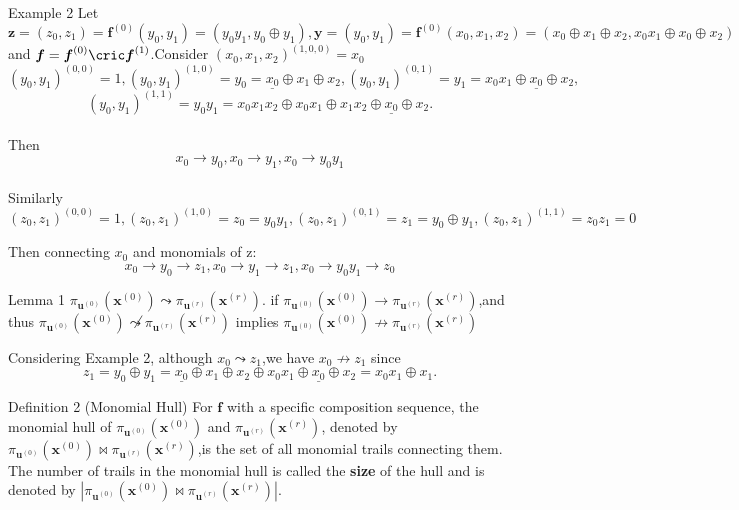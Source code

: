 \documentclass[notheorems, aspectratio=169]{beamer}
\def\bd#1{\boldsymbol{#1}}
\begin{document}
\begin{frame}
    \begin{block}{Example 2}
        Let $\boldsymbol{z}=(z_0,z_1)=\boldsymbol{f}^{(0)}(y_0,y_1)=(y_0y_1,y_0 \oplus y_1),\boldsymbol{y}=(y_0,y_1)=
        \boldsymbol{f}^{(0)}(x_0,x_1,x_2)=(x_0\oplus x_1 \oplus x_2 ,x_0x_1 \oplus x_0 \oplus x_2)$ and 
        $ \boldsymbol{f}=\boldsymbol{f}^{(0)} \cric \boldsymbol{f}^{(1)}$.Consider $(x_0,x_1,x_2)^{(1,0,0)}=x_0$
        $$
            (y_0,y_1)^{(0,0)}=1,(y_0,y_1)^{(1,0)}=y_0=\underline{x_0}\oplus x_1\oplus x_2,(y_0,y_1)^{(0,1)}=y_1=x_0x_1\oplus 
             \underline{x_0} \oplus x_2,
        $$
        $$
            (y_0,y_1)^{(1,1)}=y_0y_1=x_0x_1x_2 \oplus x_0x_1\oplus x_1x_2 \oplus \underline{x_0} \oplus x_2.
        $$
        \\Then $$ x_0 \rightarrow y_0,x_0\rightarrow y_1,x_0 \rightarrow y_0y_1$$
        \\Similarly $$ (z_0,z_1)^{(0,0)}=1,(z_0,z_1)^{(1,0)}=z_0=y_0y_1,(z_0,z_1)^{(0,1)}=z_1=y_0\oplus y_1,
         (z_0,z_1)^{(1,1)}=z_0z_1=0$$

         Then connecting $ x_0$ and monomials of z:$$ x_0 \rightarrow y_0 \rightarrow z_1,x_0 \rightarrow y_1 \rightarrow z_1,x_0 \rightarrow y_0y_1 \rightarrow z_0$$

    \end{block}
\end{frame}


\begin{frame}
    
    \begin{block}{Lemma 1}
        $\pi_{\boldsymbol{u}^{(0)}}(\boldsymbol{x}^{(0)})\leadsto \pi_{\boldsymbol{u}^{(r)}}(\boldsymbol{x}^{(r)})$.
        if $\pi_{\boldsymbol{u}^{(0)}}(\boldsymbol{x}^{(0)})\rightarrow \pi_{\boldsymbol{u}^{(r)}}(\boldsymbol{x}^{(r)})$,and thus
        $\pi_{\boldsymbol{u}^{(0)}}(\boldsymbol{x}^{(0)})\not \leadsto \pi_{\boldsymbol{u}^{(r)}}(\boldsymbol{x}^{(r)})$
        implies $\pi_{\boldsymbol{u}^{(0)}}(\boldsymbol{x}^{(0)})\not \rightarrow \pi_{\boldsymbol{u}^{(r)}}(\boldsymbol{x}^{(r)})$
    \end{block}
    Considering Example 2, although $x_0  \leadsto z_1$,we have $x_0 \not \rightarrow z_1$ since 
    $$
    z_1=y_0 \oplus y_1 =\underline{x_0} \oplus x_1\oplus x_2\oplus x_0x_1 \oplus \underline{x_0} \oplus x_2=x_0x_1\oplus x_1.
    $$
    \begin{block}{Definition 2 (Monomial Hull)}
        For $\bd{f}$ with a  specific composition sequence,
        the monomial hull of $\pi_{\boldsymbol{u}^{(0)}}(\boldsymbol{x}^{(0)})$ and $\pi_{\boldsymbol{u}^{(r)}}(\boldsymbol{x}^{(r)})$,
        denoted by $\pi_{\boldsymbol{u}^{(0)}}(\boldsymbol{x}^{(0)}) \bowtie \pi_{\boldsymbol{u}^{(r)}}(\boldsymbol{x}^{(r)})$,is the set of
        all monomial trails connecting them. The number of trails in the
        monomial hull is called the \textbf{size} of the hull and is denoted by
        $|\pi_{\boldsymbol{u}^{(0)}}(\boldsymbol{x}^{(0)}) \bowtie \pi_{\boldsymbol{u}^{(r)}}(\boldsymbol{x}^{(r)})|$.


    \end{block}
\end{frame}
\end{document}
